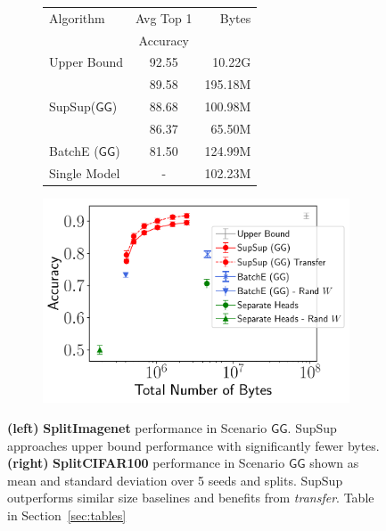 \documentclass{article}
\newcommand{\ac}{SupSup\xspace}
\newcommand{\casename}[1]{\ensuremath{\mathsf{#1}}\xspace}
\begin{document}
\begin{figure}[t]
\begin{subfigure}{.22\textwidth}
\tiny
\begin{tabular}{lcr}
\toprule
          Algorithm &  Avg Top 1 &   Bytes \\
                 &  Accuracy &    \\
\midrule
                   Upper Bound &               92.55 &  10.22G\\
  &               89.58 &    195.18M \\
\ac (\casename{GG}) &               88.68 &    100.98M \\
  &               86.37 &     65.50M \\
BatchE ($\ensuremath{\mathsf{GG}}$) &               81.50 &    124.99M \\
Single Model & - & 102.23M\\
\bottomrule
\end{tabular}

    \label{tab:splitimagenet}
\end{subfigure}
\begin{subfigure}{.21\textwidth}
\vspace{1em}
    \centering
    \includegraphics[width=\textwidth]{splitcifar100_full_icml.pdf}
    \label{fig:t1}
    \label{fig:splitcifar}
    \end{subfigure}
  \vspace{-1.2em}
    \caption{\textbf{(left)} \textbf{SplitImagenet} performance in Scenario \casename{GG}. \ac approaches upper bound performance with significantly fewer bytes. \textbf{(right)} \textbf{SplitCIFAR100} performance in Scenario \casename{GG} shown as mean and standard deviation over 5 seeds and splits. \ac outperforms similar size baselines and benefits from \textit{transfer}. Table in Section~\ref{sec:tables}}
    \label{fig:t1}
    \vspace{-1.2em}
\end{figure}
\end{document}
